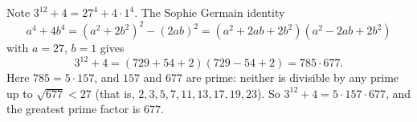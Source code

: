 Note $3^{12}+4=27^4+4\cdot1^4$. The Sophie Germain identity
\[a^4+4b^4=\left(a^2+2b^2\right)^2-(2ab)^2=\left(a^2+2ab+2b^2\right)\left(a^2-2ab+2b^2\right)\]
with $a=27$, $b=1$ gives
\[3^{12}+4=(729+54+2)(729-54+2)=785\cdot677.\]
Here $785=5\cdot157$, and $157$ and $677$ are prime: neither is divisible by any prime up to $\sqrt{677}<27$ (that is, $2,3,5,7,11,13,17,19,23$). So $3^{12}+4=5\cdot157\cdot677$, and the greatest prime factor is $\boxed{677}$.
